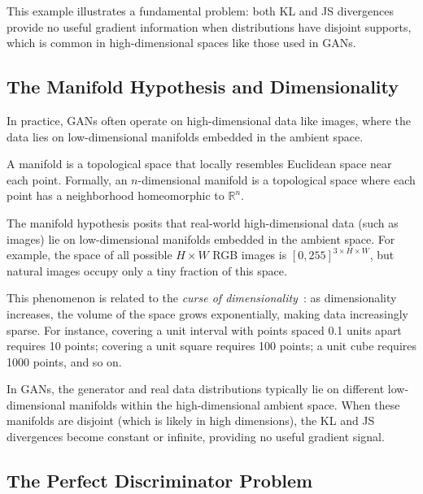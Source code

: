 This example illustrates a fundamental problem: both KL and JS divergences provide no useful gradient information when distributions have disjoint supports, which is common in high-dimensional spaces like those used in GANs.

\subsection{The Manifold Hypothesis and Dimensionality}

In practice, GANs often operate on high-dimensional data like images, where the data lies on low-dimensional manifolds embedded in the ambient space.

\begin{definition}
  A \textnormal{\sffamily manifold} is a topological space that locally resembles Euclidean space near each point. Formally, an $n$-dimensional manifold is a topological space where each point has a neighborhood homeomorphic to $\mathbb{R}^n$.
\end{definition}

\begin{remark}
  The \textnormal{\sffamily manifold hypothesis} posits that real-world high-dimensional data (such as images) lie on low-dimensional manifolds embedded in the ambient space. For example, the space of all possible $H \times W$ RGB images is $[0, 255]^{3 \times H \times W}$, but natural images occupy only a tiny fraction of this space.
\end{remark}

This phenomenon is related to the \textit{curse of dimensionality}~\cite{ref:bellman-1957}: as dimensionality increases, the volume of the space grows exponentially, making data increasingly sparse. For instance, covering a unit interval with points spaced 0.1 units apart requires 10 points; covering a unit square requires 100 points; a unit cube requires 1000 points, and so on.

In GANs, the generator and real data distributions typically lie on different low-dimensional manifolds within the high-dimensional ambient space. When these manifolds are disjoint (which is likely in high dimensions), the KL and JS divergences become constant or infinite, providing no useful gradient signal.

\subsection{The Perfect Discriminator Problem}

